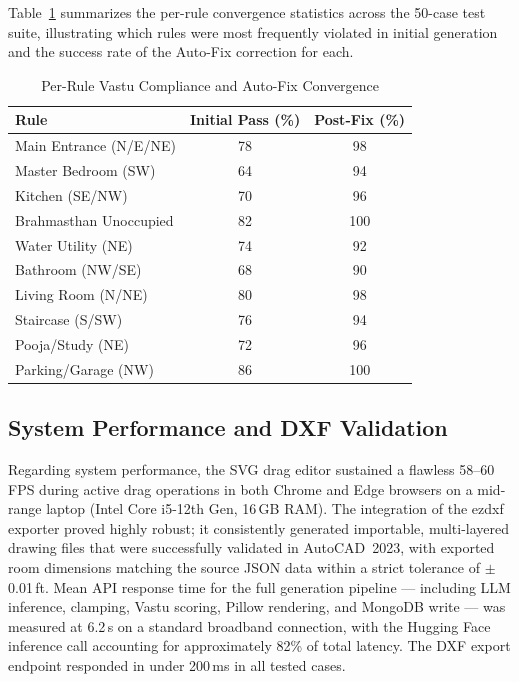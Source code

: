 \documentclass[10pt, twocolumn, letterpaper]{article}
\begin{document}
Table~\ref{tab:vastu_results} summarizes the per-rule convergence statistics
across the 50-case test suite, illustrating which rules were most frequently
violated in initial generation and the success rate of the Auto-Fix correction
for each.

\begin{table}[ht]
\caption{Per-Rule Vastu Compliance and Auto-Fix Convergence}
\label{tab:vastu_results}
\centering
\fontsize{8}{10}\selectfont
\renewcommand{\arraystretch}{1.2}
\begin{tabular}{@{}p{1.3in}cc@{}}
\toprule
\textbf{Rule} & \textbf{Initial Pass (\%)} & \textbf{Post-Fix (\%)} \\
\midrule
Main Entrance (N/E/NE)    & 78 & 98 \\
Master Bedroom (SW)       & 64 & 94 \\
Kitchen (SE/NW)           & 70 & 96 \\
Brahmasthan Unoccupied    & 82 & 100 \\
Water Utility (NE)        & 74 & 92 \\
Bathroom (NW/SE)          & 68 & 90 \\
Living Room (N/NE)        & 80 & 98 \\
Staircase (S/SW)          & 76 & 94 \\
Pooja/Study (NE)          & 72 & 96 \\
Parking/Garage (NW)       & 86 & 100 \\
\bottomrule
\end{tabular}
\end{table}

\subsection{System Performance and DXF Validation}

Regarding system performance, the SVG drag editor sustained a flawless 58--60\,FPS
during active drag operations in both Chrome and Edge browsers on a mid-range
laptop (Intel Core i5-12th Gen, 16\,GB RAM). The integration of the ezdxf
exporter proved highly robust; it consistently generated importable,
multi-layered drawing files that were successfully validated in AutoCAD~2023,
with exported room dimensions matching the source JSON data within a strict
tolerance of $\pm$0.01\,ft. Mean API response time for the full generation
pipeline --- including LLM inference, clamping, Vastu scoring, Pillow
rendering, and MongoDB write --- was measured at 6.2\,s on a standard
broadband connection, with the Hugging Face inference call accounting for
approximately 82\% of total latency. The DXF export endpoint responded in
under 200\,ms in all tested cases.
\end{document}
